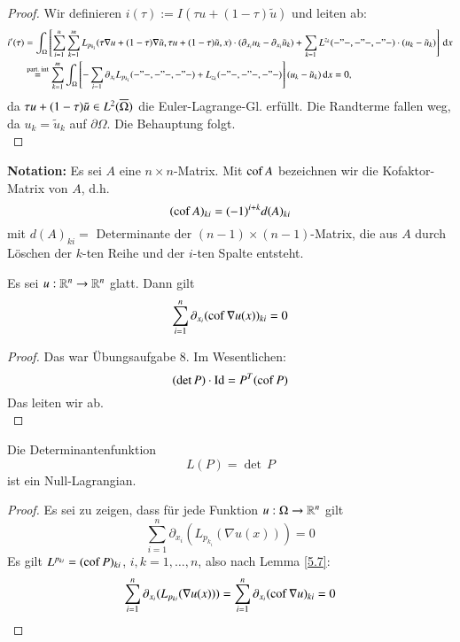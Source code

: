 \begin{proof}
    Wir definieren $i(\tau):= I(\tau u+(1-\tau)\tilde u)$ und leiten ab:
    \begin{align*}
        i'(\tau) &= \int_\Omega \left[\sum_{i=1}^n\sum_{k=1}^m L_{p_{k_i}}(\tau\nabla u + 
        (1-\tau)\nabla\tilde u,\tau u + (1-\tau)\tilde u, x)\cdot(\partial_{x_i} u_k - 
        \partial_{x_i}\tilde u_k) + \sum_{k=1} L^{z_k}(-"-,-"-,-"-)\cdot (u_k-\tilde u_k)\right] \, \mathrm{d} x \\
        &\overset{\text{part. int}}{=} \sum_{k=1}^m \int_\Omega\left[ - \sum_{i=1} \partial_{x_i}
        L_{p_{k_i}}(-"-,-"-,-"-)+ L_{z_k}(-"-,-"-,-"-) \right] (u_k-\tilde u_k) \, \mathrm{d} x =0, 
    \end{align*}
    da $\tau u + (1-\tau)\tilde u \in L^2(\overline\Omega)$ die Euler-Lagrange-Gl. erfüllt. Die Randterme
    fallen weg, da $u_k=\tilde u_k$ auf $\partial \Omega$. Die Behauptung folgt. \[ \]
\end{proof}

\noindent \textbf{Notation:} Es sei $A$ eine $n\times n$-Matrix. Mit $\mathrm{cof}\,A$ bezeichnen wir die 
Kofaktor-Matrix von $A$, d.h.
\[
    (\mathrm{cof}\, A)_{ki}= (-1)^{i+k} d(A)_{ki}
\]
mit $d(A)_{ki}=$ Determinante der $(n-1)\times(n-1)$-Matrix, die aus $A$ durch Löschen der $k$-ten
Reihe und der $i$-ten Spalte entsteht.
\begin{lem}\label{5.7}
    Es sei $u:\mathbb{R}^n\rightarrow \mathbb{R}^n$ glatt. Dann gilt
    \[
        \sum_{i=1}^n \partial_{x_i} (\mathrm{cof}\, \nabla u (x))_{ki}=0
    \]
\end{lem}

\begin{proof}
    Das war Übungsaufgabe 8. Im Wesentlichen:
    \[
        (\det P)\cdot \mathrm{Id} = P^T(\mathrm{cof} \, P)
    \]
    Das leiten wir ab. \[ \]
\end{proof}

\begin{theorem}\label{5.8}
    Die Determinantenfunktion
    \[
        L(P)=\det \, P
    \]
    ist ein Null-Lagrangian.
\end{theorem}

\begin{proof}
    Es sei zu zeigen, dass für jede Funktion $u:\Omega\rightarrow \mathbb{R}^n$ gilt
    \[
        \sum_{i=1}^n\partial _{x_i} (L_{p_{k_i}}(\nabla u (x)))=0
    \]
    Es gilt $L^{p_{ki}}=(\mathrm{cof}\, P)_{ki}$, $i,k=1,…,n$, also nach Lemma \ref{5.7}:
    \[
        \sum_{i=1}^n\partial _{x_i}(L_{p_{ki}}(\nabla u(x)))=\sum_{i=1}^n\partial_{x_i}(\mathrm{cof}\, \nabla
         u)_{ki} =0
    \]
\end{proof}

